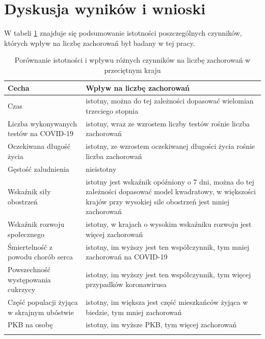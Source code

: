 \documentclass[12pt]{mwbk}
\theoremstyle{plain}
\theoremstyle{definition}
\theoremstyle{remark}
\newcommand\zrodlo[1]{\par\vspace{-3mm}{\small\textit{Źródło: }#1 }}
\begin{document}
\chapter*{Dyskusja wyników i wnioski}


W tabeli \ref{tab:istotnosc} znajduje się podsumowanie istotności poszczególnych czynników, których wpływ na liczbę zachorowań był badany w tej pracy.


\begin{longtable}{| p{} | p{} |}
	\hline
	Cecha & Wpływ na liczbę zachorowań \\ \hline \hline 
	Czas & istotny, można do tej zależności dopasować wielomian trzeciego stopnia \\ \hline
	Liczba wykonywanych testów na COVID-19 & istotny, wraz ze wzrostem liczby testów rośnie liczba zachorowań \\ \hline
	Oczekiwana długość życia & istotny, ze wzrostem oczekiwanej długości życia rośnie liczba zachorowań \\ \hline 
	Gęstość zaludnienia & nieistotny \\ \hline
	Wskaźnik siły obostrzeń & istotny jest wskaźnik opóźniony o 7 dni, można do tej zależności dopasować model kwadratowy, w większości krajów przy wysokiej sile obostrzeń jest mniej zachorowań \\ \hline
	Wskaźnik rozwoju społecznego & istotny, w krajach o wysokim wskaźniku rozwoju jest więcej zachorowań \\ \hline
	Śmiertelność z powodu chorób serca & istotny, im wyższy jest ten współczynnik, tym mniej zachorowań na COVID-19 \\ \hline
	Powszechność występowania cukrzycy & istotny, im wyższy jest ten współczynnik, tym więcej przypadków koronawirusa \\ \hline
	Część populacji żyjąca w skrajnym ubóstwie & istotny, im większa jest część mieszkańców żyjąca w biedzie, tym mniej zachorowań \\ \hline
	PKB na osobę & istotny, im wyższe PKB, tym więcej zachorowań \\ \hline
	\caption{Porównanie istotności i wpływu różnych czynników na liczbę zachorowań w przeciętnym kraju}
	
	\label{tab:istotnosc}
	
	\end{longtable}
\begin{center}\zrodlo{Opracowanie własne}
	\end{center}
\end{document}
